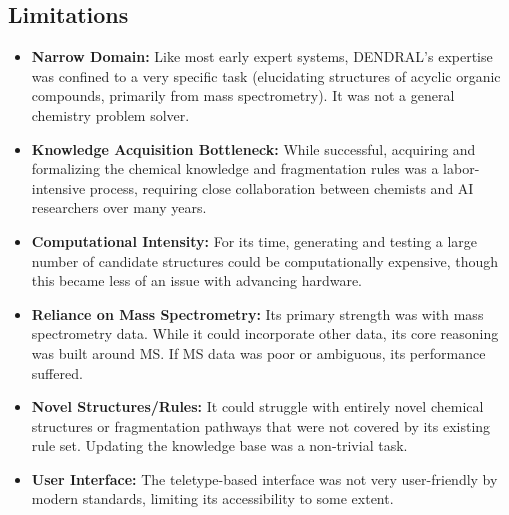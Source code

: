 \documentclass[12pt,a4paper]{article}
\begin{document}
\subsection{Limitations}
\begin{itemize}
    \item \textbf{Narrow Domain:} Like most early expert systems, DENDRAL's expertise was confined to a very specific task (elucidating structures of acyclic organic compounds, primarily from mass spectrometry). It was not a general chemistry problem solver.
    \item \textbf{Knowledge Acquisition Bottleneck:} While successful, acquiring and formalizing the chemical knowledge and fragmentation rules was a labor-intensive process, requiring close collaboration between chemists and AI researchers over many years.
    \item \textbf{Computational Intensity:} For its time, generating and testing a large number of candidate structures could be computationally expensive, though this became less of an issue with advancing hardware.
    \item \textbf{Reliance on Mass Spectrometry:} Its primary strength was with mass spectrometry data. While it could incorporate other data, its core reasoning was built around MS. If MS data was poor or ambiguous, its performance suffered.
    \item \textbf{Novel Structures/Rules:} It could struggle with entirely novel chemical structures or fragmentation pathways that were not covered by its existing rule set. Updating the knowledge base was a non-trivial task.
    \item \textbf{User Interface:} The teletype-based interface was not very user-friendly by modern standards, limiting its accessibility to some extent.
\end{itemize}

\end{document}
